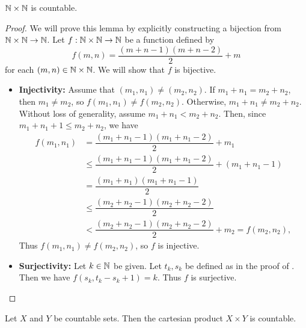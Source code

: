 \bigskip

\begin{lemma} \label{lem:NxNIsCountable}
    $\mathbb{N} \times \mathbb{N}$ is countable.
\end{lemma}

\begin{proof}
    We will prove this lemma by explicitly constructing a bijection from $\mathbb{N} \times \mathbb{N} \to \mathbb{N}$.
    Let $f: \mathbb{N} \times \mathbb{N} \to \mathbb{N}$ be a function defined by
    \[
    f(m, n) = \frac{(m + n - 1)(m + n - 2)}{2} + m
    \]
    for each $(m, n) \in \mathbb{N} \times \mathbb{N}$. We will show that $f$ is bijective.
    \begin{itemize}
        \item \textbf{Injectivity:} Assume that $(m_{1}, n_{1}) \neq (m_{2}, n_{2})$. If $m_{1} + n_{1} = m_{2} + n_{2}$,
        then $m_{1} \neq m_{2}$, so $f(m_{1}, n_{1}) \neq f(m_{2}, n_{2})$. Otherwise, $m_{1} + n_{1} \neq m_{2} + n_{2}$.
        \\[6mm]
        Without loss of generality, assume $m_{1} + n_{1} < m_{2} + n_{2}$. Then, since
        $m_{1} + n_{1} + 1 \leq m_{2} + n_{2}$, we have
        \begin{align*}
            f(m_{1}, n_{1}) &= \dfrac{(m_{1} + n_{1} - 1)(m_{1} + n_{1} - 2)}{2} + m_{1} \\
            &\leq \dfrac{(m_{1} + n_{1} - 1)(m_{1} + n_{1} - 2)}{2} + (m_{1} + n_{1} - 1) \\
            &= \dfrac{(m_{1} + n_{1})(m_{1} + n_{1} - 1)}{2} \\
            &\leq \dfrac{(m_{2} + n_{2} - 1)(m_{2} + n_{2} - 2)}{2} \\
            &< \dfrac{(m_{2} + n_{2} - 1)(m_{2} + n_{2} - 2)}{2} + m_{2} = f(m_{2}, n_{2}),
        \end{align*}
        Thus $f(m_{1}, n_{1}) \neq f(m_{2}, n_{2})$, so $f$ is injective.
        \item \textbf{Surjectivity:} Let $k \in \mathbb{N}$ be given. Let $t_{k}, s_{k}$ be defined as in the proof of
        . Then we have $f(s_{k}, t_{k} - s_{k} + 1) = k$.
        Thus $f$ is surjective.
    \end{itemize}
\end{proof}

\bigskip

\begin{theorem} \label{thm:ProductOfTwoCountableSetsIsCountable}
    Let $X$ and $Y$ be countable sets. Then the cartesian product $X \times Y$ is countable.
\end{theorem}

